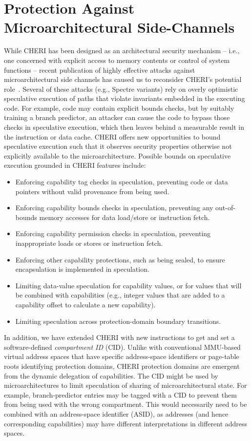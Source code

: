 \section{Protection Against Microarchitectural Side-Channels}
\label{section:microarchitectural-sidechannels}

While CHERI has been designed as an architectural security mechanism -- i.e.,
one concerned with explicit access to memory contents or control of system
functions -- recent publication of highly effective attacks against
microarchitectural side channels has caused us to reconsider CHERI's potential
role~\cite{Kocher2018spectre}.
Several of these attacks (e.g., Spectre variants) rely on overly optimistic
speculative execution of paths that violate invariants embedded in the
executing code.
For example, code may contain explicit bounds checks, but by suitably training
a branch predictor, an attacker can cause the code to bypass those checks in
speculative execution, which then leaves behind a measurable result in the
instruction or data cache.
CHERI offers new opportunities to bound speculative execution such that it
observes security properties otherwise not explicitly available to the
microarchitecture.
Possible bounds on speculative execution grounded in CHERI features include:

\begin{itemize}
\item Enforcing capability tag checks in speculation, preventing code or data
  pointers without valid provenance from being used.
\item Enforcing capability bounds checks in speculation, preventing any
  out-of-bounds memory accesses for data load/store or instruction fetch.
\item Enforcing capability permission checks in speculation, preventing
  inappropriate loads or stores or instruction fetch.
\item Enforcing other capability protections, such as being sealed, to ensure
  encapsulation is implemented in speculation.
\item Limiting data-value speculation for capability values, or for values
  that will be combined with capabilities (e.g., integer values that are added
  to a capability offset to calculate a new capability).
\item Limiting speculation across protection-domain boundary transitions.
\end{itemize}

In addition, we have extended CHERI with new instructions to get and set a
software-defined \textit{compartment ID} (CID).
Unlike with conventional MMU-based virtual address spaces that have specific
address-space identifiers or page-table roots identifying protection domains,
CHERI protection domains are emergent from the dynamic delegation of
capabilities.
The CID might be used by microarchitectures to limit speculation of sharing
of microarchitectural state.
For example, branch-predictor entries may be tagged with a CID to prevent them
from being used with the wrong compartment.
This would necessarily need to be combined with an address-space identifier
(ASID), as addresses (and hence corresponding capabilities) may have different
interpretations in different address spaces.

